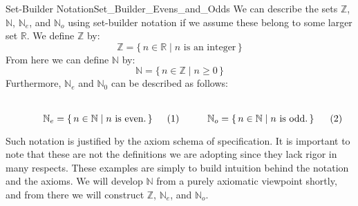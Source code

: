         \begin{lexample}{Set-Builder Notation}{Set_Builder_Evens_and_Odds}
            We can describe the sets $\mathbb{Z}$, $\mathbb{N}$,
            $\mathbb{N}_{e}$, and $\mathbb{N}_{o}$ using set-builder
            notation if we assume these belong to some larger set
            $\mathbb{R}$. We define $\mathbb{Z}$ by:
            \begin{equation}
                \mathbb{Z}=\{\,n\in\mathbb{R}\;|\;
                               n\textrm{ is an integer}\,\}
            \end{equation}
            From here we can define $\mathbb{N}$ by:
            \begin{equation}
                \mathbb{N}=\{\,n\in\mathbb{Z}\;|\;n\geq{0}\,\}
            \end{equation}
            Furthermore, $\mathbb{N}_{e}$ and $\mathbb{N}_{0}$ can be
            described as follows:
            \par
            \begin{subequations}
                \begin{minipage}[b]{0.49\textwidth}
                    \centering
                    \begin{equation}
                        \label{eqn:Even_Pos_Ints_Set_Builder}%
                        \mathbb{N}_{e}=\{\,n\in\mathbb{N}\;|\;
                                           n\textrm{ is even.}\,\}
                    \end{equation}
                \end{minipage}
                \hfill
                \begin{minipage}[b]{0.49\textwidth}
                    \centering
                    \begin{equation}
                        \label{eqn:Odd_Pos_Ints_Set_Builder}%
                        \mathbb{N}_{o}=\{\,n\in\mathbb{N}\;|\;
                                           n\textrm{ is odd.}\,\}
                    \end{equation}
                \end{minipage}
            \end{subequations}
            \par\vspace{2.5ex}
            Such notation is justified by the axiom schema of
            specification. It is important to note that these are not the
            definitions we are adopting since they lack rigor in many respects.
            These examples are simply to build intuition behind the notation
            and the axioms. We will develop $\mathbb{N}$ from a purely
            axiomatic viewpoint shortly, and from there we will construct
            $\mathbb{Z}$, $\mathbb{N}_{e}$, and $\mathbb{N}_{o}$.
        \end{lexample}
